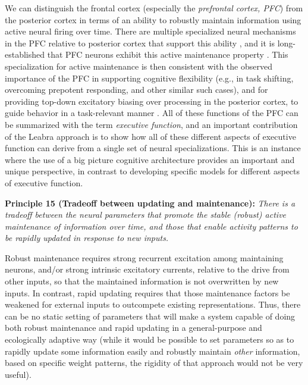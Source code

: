 \documentclass[11pt,twoside]{article}
\begin{document}
We can distinguish the frontal cortex (especially the {\em prefrontal cortex,
  PFC}) from the posterior cortex in terms of an ability to robustly maintain
information using active neural firing over time.  There are multiple
specialized neural mechanisms in the PFC relative to posterior cortex that
support this ability \cite{WangMarkramGoodmanEtAl06,HazyPauliHerdEtAlInPrep},
and it is long-established that PFC neurons exhibit this active maintenance
property
\cite{FusterAlexander71,GoldmanRakic95,KubotaNiki71,MillerEricksonDesimone96,MiyashitaChang88}.  This specialization for active maintenance is then
consistent with the observed importance of the PFC in supporting cognitive
flexibility (e.g., in task shifting, overcoming prepotent responding, and
other similar such cases), and for providing top-down excitatory biasing over
processing in the posterior cortex, to guide behavior in a task-relevant
manner \cite{BraverCohen00,CohenDunbarMcClelland90,CohenServanSchreiber89,HerdBanichOReilly06,MillerCohen01}.  All of these functions of the PFC can
be summarized with the term {\em executive function}, and an important
contribution of the Leabra approach is to show how all of these different
aspects of executive function can derive from a single set of neural
specializations.  This is an instance where the use of a big picture cognitive
architecture provides an important and unique perspective, in contrast to
developing specific models for different aspects of executive function.

{\bf Principle 15 (Tradeoff between updating and maintenance):} {\em There is
  a tradeoff between the neural parameters that promote the stable (robust)
  active maintenance of information over time, and those that enable activity
  patterns to be rapidly updated in response to new inputs.}  

Robust maintenance requires strong recurrent excitation among maintaining
neurons, and/or strong intrinsic excitatory currents, relative to the drive
from other inputs, so that the maintained information is not overwritten by
new inputs.  In contrast, rapid updating requires that those maintenance
factors be weakened for external inputs to outcompete existing
representations.  Thus, there can be no static setting of parameters that will
make a system capable of doing both robust maintenance and rapid updating in a
general-purpose and ecologically adaptive way (while it would be possible to
set parameters so as to rapidly update some information easily and robustly
maintain {\em other} information, based on specific weight patterns, the
rigidity of that approach would not be very useful).
\end{document}
